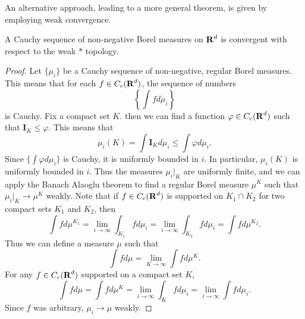 An alternative approach, leading to a more general theorem, is given by employing weak convergence.

\begin{lemma} \label{weakstarcompleteness}
	A Cauchy sequence of non-negative Borel measures on $\operatorname{\mathbf{R}}^d$ is convergent with respect to the weak $*$ topology.
\end{lemma}
\begin{proof}
	Let $\{ \mu_i \}$ be a Cauchy sequence of non-negative, regular Borel measures. This means that for each $f \in C_c(\operatorname{\mathbf{R}}^d)$, the sequence of numbers
	\[ \left\{ \int f d\mu_i \right\} \]
	is Cauchy. Fix a compact set $K$. then we can find a function $\varphi \in C_c(\operatorname{\mathbf{R}}^d)$ such that $\mathbf{I}_K \leq \varphi$. This means that
	\[ \mu_i(K) = \int \mathbf{I}_K d\mu_i \leq \int \varphi d\mu_i. \]
	Since $\{ \int \varphi d\mu_i \}$ is Cauchy, it is uniformly bounded in $i$. In particular, $\mu_i(K)$ is uniformly bounded in $i$. Thus the measures $\mu_i|_K$ are uniformly finite, and we can apply the Banach Alaoglu theorem to find a regular Borel measure $\mu^K$ such that $\mu_i|_K \to \mu^K$ weakly. Note that if $f \in C_c(\operatorname{\mathbf{R}}^d)$ is supported on $K_1 \cap K_2$ for two compact sets $K_1$ and $K_2$, then
	\[ \int f d\mu^{K_1} = \lim_{i \to \infty} \int_{K_1} f d\mu_i = \lim_{i \to \infty} \int_{K_2} f d \mu_i = \int f d\mu^{K_2}. \]
	Thus we can define a measure $\mu$ such that
	\[ \int f d\mu = \lim_{K \to \infty} \int f d\mu^K. \]
	For any $f \in C_c(\operatorname{\mathbf{R}}^d)$ supported on a compact set $K$,
	\[ \int f d\mu = \int f d\mu^K = \lim_{i \to \infty} \int_K f d\mu_i = \lim_{i \to \infty} \int f d\mu_i. \]
	Since $f$ was arbitrary, $\mu_i \to \mu$ weakly.
\end{proof}

